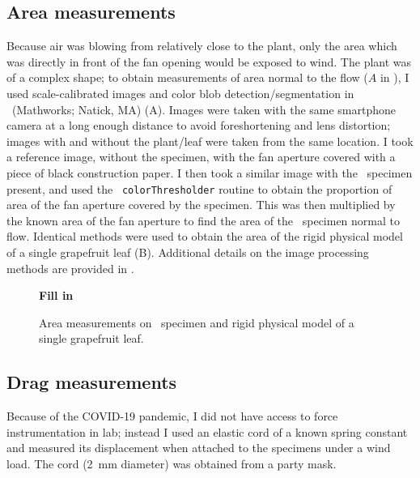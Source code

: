 \subsection{Area measurements}
Because air was blowing from relatively close to the plant, only the area which was directly in front of the fan opening would be exposed to wind. The plant was of a complex shape; to obtain measurements of area normal to the flow ($A$ in ), I used scale-calibrated images and color blob detection/segmentation in \Matlab\ (Mathworks; Natick, MA) (A). Images were taken with the same smartphone camera at a long enough distance to avoid foreshortening and lens distortion; images with and without the plant/leaf were taken from the same location. I took a reference image, without the specimen, with the fan aperture covered with a piece of black construction paper. I then took a similar image with the \Cxparadisi\ specimen present, and used the \Matlab\ \lstinline{colorThresholder} routine to obtain the proportion of area of the fan aperture covered by the specimen. This was then multiplied by the known area of the fan aperture to find the area of the \Cxparadisi\ specimen normal to flow. Identical methods were used to obtain the area of the rigid physical model of a single grapefruit leaf (B). Additional details on the image processing methods are provided in . 
\begin{figure}
\begin{center}
\textbf{Fill in}
\end{center}
\caption{Area measurements on \Cxparadisi\ specimen and rigid physical model of a single grapefruit leaf.}
\label{fig:methods:area}
\end{figure}





\subsection{Drag measurements}
Because of the COVID-19 pandemic, I did not have access to force instrumentation in lab; instead I used an elastic cord of a known spring constant and measured its displacement when attached to the specimens under a wind load. The cord (\SI{2}{\milli\meter} diameter) was obtained from a party mask. 

